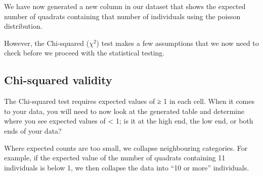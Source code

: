 \documentclass[
  letterpaper,
  DIV=11,
  numbers=noendperiod]{scrreprt}
\newenvironment{Shaded}{\begin{snugshade}}{\end{snugshade}}
\newcommand{\AttributeTok}[1]{\textcolor[rgb]{0.40,0.45,0.13}{#1}}
\newcommand{\CommentTok}[1]{\textcolor[rgb]{0.37,0.37,0.37}{#1}}
\newcommand{\FunctionTok}[1]{\textcolor[rgb]{0.28,0.35,0.67}{#1}}
\newcommand{\NormalTok}[1]{\textcolor[rgb]{0.00,0.23,0.31}{#1}}
\newcommand{\OtherTok}[1]{\textcolor[rgb]{0.00,0.23,0.31}{#1}}
\newcommand{\SpecialCharTok}[1]{\textcolor[rgb]{0.37,0.37,0.37}{#1}}
\begin{document}
\begin{Shaded}
\end{Shaded}

We have now generated a new column in our dataset that shows the
expected number of quadrats containing that number of individuals using
the poisson distribution.

However, the Chi-squared (\(\chi^2\)) test makes a few assumptions that
we now need to check before we proceed with the statistical testing.

\subsection{Chi-squared validity}\label{chi-squared-validity}

The Chi-squared test requires expected values of ≥ 1 in each cell. When
it comes to your data, you will need to now look at the generated table
and determine where you see expected values of \textless{} 1; is it at
the high end, the low end, or both ends of your data?

Where expected counts are too small, we collapse neighbouring
categories. For example, if the expected value of the number of quadrats
containing 11 individuals is below 1, we then collapse the data into
``10 or more'' individuals.
\end{document}
